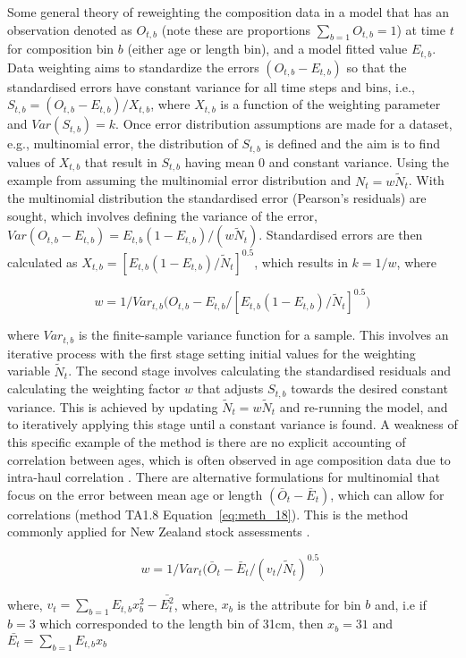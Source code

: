 \documentclass[12pt,preprint,authoryear]{article}
\begin{document}
Some general theory of reweighting the composition data in a model that has an observation denoted as $O_{t,b}$ (note these are proportions \(\sum_{b = 1}O_{t,b} = 1 \)) at time $t$ for composition bin $b$ (either age or length bin), and a model fitted value $E_{t,b}$. Data weighting aims to standardize the errors $(O_{t,b} - E_{t,b})$ so that the standardised errors have constant variance for all time steps and bins, i.e., $S_{t,b} = (O_{t,b} - E_{t,b}) / X_{t,b}$, where $X_{t,b}$ is a function of the weighting parameter and $Var(S_{t,b}) = k$. Once error distribution assumptions are made for a dataset, e.g., multinomial error, the distribution of $S_{t,b}$ is defined and the aim is to find values of $X_{t,b}$ that result in  $S_{t,b}$ having mean 0 and constant variance.  Using the example from \cite{mcallister1997bayesian} assuming the multinomial error distribution and $N_t = w\tilde{N}_t$. With the multinomial distribution the standardised error (Pearson's residuals) are sought, which involves defining the variance of the error, $Var(O_{t,b} - E_{t,b}) = E_{t,b}(1 - E_{t,b}) / (w \tilde{N}_t)$. Standardised errors are then calculated as $X_{t,b} =  \left[E_{t,b}(1 - E_{t,b}) / \tilde{N}_t\right]^{0.5}$, which results in $k = 1/w$, where

\[
w = 1/ Var_{t,b}\bigg(O_{t,b} - E_{t,b} / \left[E_{t,b}(1 - E_{t,b}) / \tilde{N}_t\right]^{0.5}\bigg)
\]

where $Var_{t,b}$ is the finite-sample variance function for a sample. This involves an iterative process with the first stage setting initial values for the weighting variable $\tilde{N}_t$. The second stage involves calculating the standardised residuals and calculating the weighting factor $w$ that adjusts $S_{t,b}$ towards the desired constant variance. This is achieved by updating $\tilde{N}_t = w\tilde{N}_t$ and re-running the model, and to iteratively applying this stage until a constant variance is found. A weakness of this specific example of the method is there are no explicit accounting of correlation between ages, which is often observed in age composition data due to intra-haul correlation \citep{pennington1994assessing}. There are alternative formulations for multinomial that focus on the error between mean age or length $(\bar{O}_{t} - \bar{E}_{t})$, which can allow for correlations (method TA1.8 \cite{francis2011data} Equation~\ref{eq:meth_18}). This is the method commonly applied for New Zealand stock assessments \citep{plenary_14}.

\begin{equation}\label{eq:meth_18}
w = 1/ Var_{t}\bigg(\bar{O}_{t} - \bar{E}_{t} / \left(v_t /\tilde{N}_t  \right)^{0.5}\bigg)
\end{equation}

where, \(v_t = \sum_{b = 1} E_{t,b}x_b^2 - \bar{E_t^2}\), where, \(x_b\) is the attribute for bin \(b\) and, i.e if \(b = 3\) which corresponded to the length bin of 31cm, then \(x_b = 31\) and \(\bar{E_t} = \sum_{b = 1}  E_{t,b}x_b \)




\end{document}
